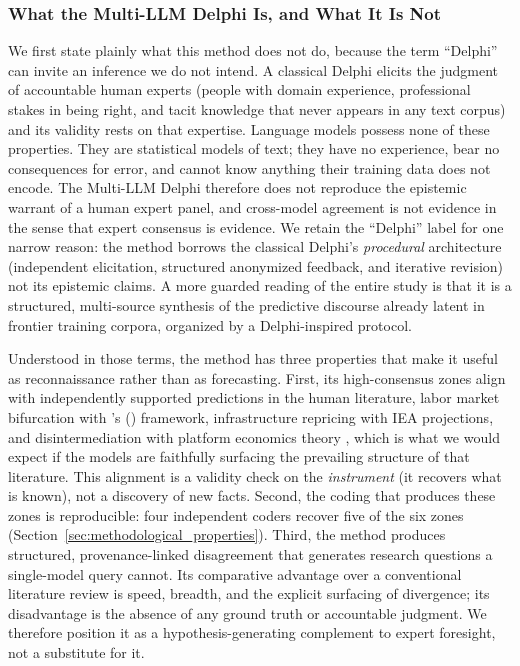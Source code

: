 \documentclass[preprint,review,12pt]{elsarticle}
\begin{document}
\subsubsection{What the Multi-LLM Delphi Is, and What It Is Not}
\label{sec:validity}

We first state plainly what this method does not do, because the term ``Delphi'' can invite an inference we do not intend. A classical Delphi elicits the judgment of accountable human experts (people with domain experience, professional stakes in being right, and tacit knowledge that never appears in any text corpus) and its validity rests on that expertise. Language models possess none of these properties. They are statistical models of text; they have no experience, bear no consequences for error, and cannot know anything their training data does not encode. The Multi-LLM Delphi therefore does not reproduce the epistemic warrant of a human expert panel, and cross-model agreement is not evidence in the sense that expert consensus is evidence. We retain the ``Delphi'' label for one narrow reason: the method borrows the classical Delphi's \emph{procedural} architecture (independent elicitation, structured anonymized feedback, and iterative revision) not its epistemic claims. A more guarded reading of the entire study is that it is a structured, multi-source synthesis of the predictive discourse already latent in frontier training corpora, organized by a Delphi-inspired protocol.

Understood in those terms, the method has three properties that make it useful as reconnaissance rather than as forecasting. First, its high-consensus zones align with independently supported predictions in the human literature, labor market bifurcation with \citeauthor{acemoglu2019automation}'s (\citeyear{acemoglu2019automation}) framework, infrastructure repricing with IEA projections, and disintermediation with platform economics theory \citep{goldfarb2019digital}, which is what we would expect if the models are faithfully surfacing the prevailing structure of that literature. This alignment is a validity check on the \emph{instrument} (it recovers what is known), not a discovery of new facts. Second, the coding that produces these zones is reproducible: four independent coders recover five of the six zones (Section~\ref{sec:methodological_properties}). Third, the method produces structured, provenance-linked disagreement that generates research questions a single-model query cannot. Its comparative advantage over a conventional literature review is speed, breadth, and the explicit surfacing of divergence; its disadvantage is the absence of any ground truth or accountable judgment. We therefore position it as a hypothesis-generating complement to expert foresight, not a substitute for it.
\end{document}
